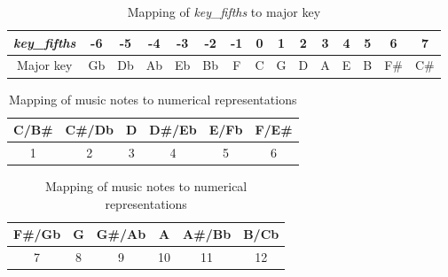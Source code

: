     \begin{table}
        \caption{Mapping of \emph{key\_fifths} to major key}
        \label{tab:kf_map}
        \centering
        \begin{tabular}{|c||c|c|c|c|c|c|c|c|c|c|c|c|c|c|}
        \hline
        \emph{key\_fifths} & -6 & -5 & -4 & -3 & -2 & -1 & 0 & 1 & 2 & 3 & 4 & 5 & 6 & 7 \\
        \hline
        Major key & Gb & Db & Ab & Eb & Bb & F & C & G & D & A & E & B & F\# & C\# \\
        \hline
        \end{tabular}
        \end{table}

\begin{table}
    \caption{Mapping of music notes to numerical representations}
    \label{tab:note_map}
    \centering
    \begin{tabular}{|c|c|c|c|c|c|}
    \hline
    C/B\# & C\#/Db & D & D\#/Eb & E/Fb & F/E\# \\
    \hline
    1 & 2 & 3 & 4 & 5 & 6 \\
    \hline
    \end{tabular}
    \begin{tabular}{|c|c|c|c|c|c|}
        \hline
    F\#/Gb & G & G\#/Ab & A & A\#/Bb & B/Cb\\
    \hline
    7 & 8 & 9 & 10 & 11 & 12\\
    \hline
    \end{tabular}
    \end{table}

